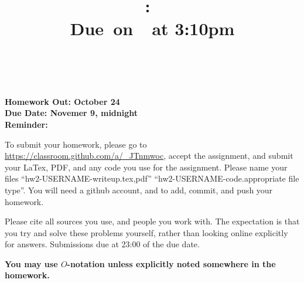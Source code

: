 \documentclass{article}
\title{    \vspace{2in}
    \textmd{\textbf{\hmwkClass:\ \hmwkTitle}}\\
    \normalsize\vspace{0.1in}\small{Due\ on\ \hmwkDueDate\ at 3:10pm}\\
    \vspace{0.1in}\large{\textit{\hmwkClassInstructor\ \hmwkClassTime}}
    \vspace{3in}
}
\author{\hmwkAuthorName}
\date{}
\theoremstyle{plain}
\newcommand{\hmwkAssignedDate}{October 24}
\newcommand{\hmwkDueDate}{Novemer 9, midnight}
\begin{document}

\pagebreak

{\bf Homework Out: \hmwkAssignedDate}\\
{\bf Due Date:  \hmwkDueDate}\\
{\bf Reminder: }

To submit your homework, please go to
\url{https://classroom.github.com/a/_JTnmwoc}, accept the assignment,
and submit your LaTex, PDF, and any code you use for the
assignment. Please name your files ``hw2-USERNAME-writeup.{tex,pdf}''
``hw2-USERNAME-code.{appropriate file type}''. You will need a github
account, and to add, commit, and push your homework.

Please cite all sources you use, and people you work with. The
expectation is that you try and solve these problems yourself, rather
than looking online explicitly for answers. Submissions due at 23:00
of the due date.

{\bf You may use $O$-notation unless explicitly noted somewhere in the homework.}


\newcommand{\X}{\mathcal{X}}
\newcommand{\Y}{\mathcal{Y}}
\newcommand{\D}{\mathcal{D}}
\end{document}

